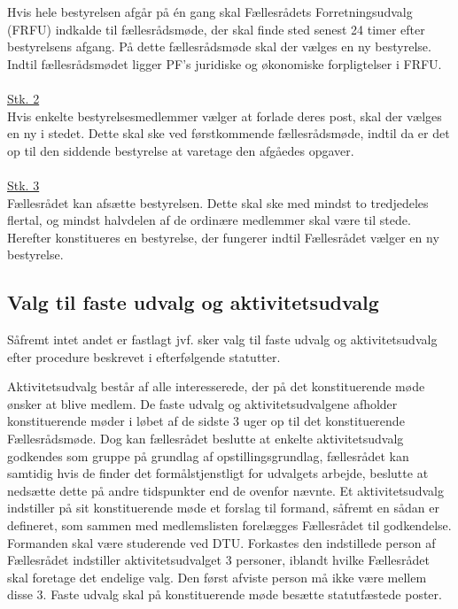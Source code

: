 \begin{list}
\item Hvis hele bestyrelsen afgår på én gang skal Fællesrådets Forretningsudvalg (FRFU) indkalde til fællesrådsmøde, der skal finde sted senest 24 timer efter bestyrelsens afgang. På dette fællesrådsmøde skal der vælges en ny bestyrelse. Indtil fællesrådsmødet ligger PF's juridiske og økonomiske forpligtelser i FRFU.\\
\\
\underline{Stk. 2}\\
Hvis enkelte bestyrelsesmedlemmer vælger at forlade deres post, skal der vælges en ny i stedet. Dette skal ske ved førstkommende fællesrådsmøde, indtil da er det op til den siddende bestyrelse at varetage den afgåedes opgaver.\\
\\
\underline{Stk. 3}\\
Fællesrådet kan afsætte bestyrelsen. Dette skal ske med mindst to tredjedeles flertal, og mindst halvdelen af de ordinære medlemmer skal være til stede. Herefter konstitueres en bestyrelse, der fungerer indtil Fællesrådet vælger en ny bestyrelse.

\subsection{Valg til faste udvalg og aktivitetsudvalg} \label{kap:ValgTilUdvalg}
\item Såfremt intet andet er fastlagt jvf.  sker valg til faste udvalg og aktivitetsudvalg efter procedure beskrevet i efterfølgende statutter.\\

\item Aktivitetsudvalg består af alle interesserede, der på det konstituerende møde ønsker at blive medlem. De faste udvalg og aktivitetsudvalgene afholder konstituerende møder i løbet af de sidste 3 uger op til det konstituerende Fællesrådsmøde. Dog kan fællesrådet beslutte at enkelte aktivitetsudvalg godkendes som gruppe på grundlag af opstillingsgrundlag, fællesrådet kan samtidig hvis de finder det formålstjenstligt for udvalgets arbejde, beslutte at nedsætte dette på andre tidspunkter end de ovenfor nævnte. Et aktivitetsudvalg indstiller på sit konstituerende møde et forslag til formand, såfremt en sådan er defineret, som sammen med medlemslisten forelægges Fællesrådet til godkendelse. Formanden skal være studerende ved DTU. Forkastes den indstillede person af Fællesrådet indstiller aktivitetsudvalget 3 personer, iblandt hvilke Fællesrådet skal foretage det endelige valg. Den først afviste person må ikke være mellem disse 3. Faste udvalg skal på konstituerende møde besætte statutfæstede poster.


\end{list}
